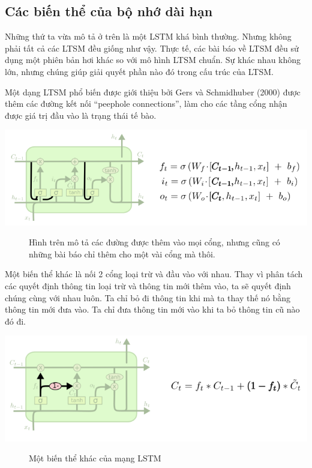 \subsection{Các biến thể của bộ nhớ dài hạn}
Những thứ ta vừa mô tả ở trên là một LSTM khá bình thường. Nhưng không phải tất cả các LTSM đều giống như vậy. Thực tế, các bài báo về LTSM đều sử dụng một phiên bản hơi khác so với mô hình LTSM chuẩn. Sự khác nhau không lớn, nhưng chúng giúp giải quyết phần nào đó trong cấu trúc của LTSM.

Một dạng LTSM phổ biến được giới thiệu bởi Gers và Schmidhuber (2000) được thêm các đường kết nối “peephole connections”, làm cho các tầng cổng nhận được giá trị đầu vào là trạng thái tế bào.
\begin{center}
    \includegraphics[scale=.5]{image/chapter6/bth1.png}
    \begin{figure}[htp]
    \begin{center}
     
    \end{center}
    \caption[Mô tả các đường được thêm vào cổng LSTM]{Hình trên mô tả các đường được thêm vào mọi cổng, nhưng cũng có những bài báo chỉ thêm cho một vài cổng mà thôi.}
    \end{figure}
\end{center}
Một biến thể khác là nối 2 cổng loại trừ và đầu vào với nhau. Thay vì phân tách các quyết định thông tin loại trừ và thông tin mới thêm vào, ta sẽ quyết định chúng cùng với nhau luôn. Ta chỉ bỏ đi thông tin khi mà ta thay thế nó bằng thông tin mới đưa vào. Ta chỉ đưa thông tin mới vào khi ta bỏ thông tin cũ nào đó đi.
\begin{center}
    \includegraphics[scale=.5]{image/chapter6/bth2.png}
    \begin{figure}[htp]
    \begin{center}
     
    \end{center}
    \caption{Một biến thể khác của mạng LSTM}
    \end{figure}
\end{center}
